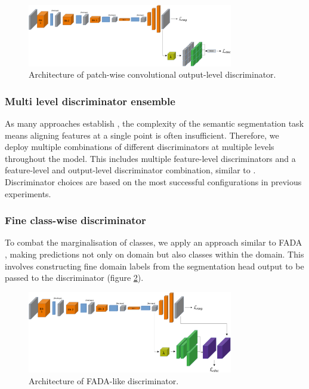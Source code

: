\documentclass[a4paper,12pt]{report}
\begin{document}
\bigbreak
\begin{figure}[h]
    \centering
    \includegraphics[width=0.8\textwidth]{res/discriminator-diagrams/patch-convolutional-output.pdf}
    \caption{Architecture of patch-wise convolutional output-level discriminator.}
    \label{fig:das-discriminators-patch-conv-output}
\end{figure}

\subsubsection{Multi level discriminator ensemble}
As many approaches establish \cite{hoffman_fcns_2016} \cite{bermudez-chacon_domain-adaptive_2018}, the complexity of the semantic segmentation task means aligning features at a single point is often insufficient. Therefore, we deploy multiple combinations of different discriminators at multiple levels throughout the model. This includes multiple feature-level discriminators and a feature-level and output-level discriminator combination, similar to \cite{tsai_learning_2020}. Discriminator choices are based on the most successful configurations in previous experiments.

\subsubsection{Fine class-wise discriminator}
To combat the marginalisation of classes, we apply an approach similar to FADA \cite{wang_classes_2020}, making predictions not only on domain but also classes within the domain. This involves constructing fine domain labels from the segmentation head output to be passed to the discriminator (figure \ref{fig:das-discriminators-fada}).

\bigbreak
\begin{figure}[h]
    \centering
    \includegraphics[width=0.8\textwidth]{res/discriminator-diagrams/fada.pdf}
    \caption{Architecture of FADA-like discriminator.}
    \label{fig:das-discriminators-fada}
\end{figure}
\end{document}
